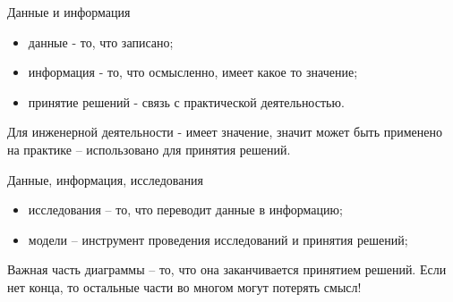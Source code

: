 \begin{frame}{Данные и информация}

\begin{center}
    
\end{center}

\begin{itemize}
    \item данные - то, что записано;
    \item информация - то, что осмысленно, имеет какое то значение;
    \item принятие решений - связь с практической деятельностью.
\end{itemize}

Для инженерной деятельности - имеет значение, значит может быть применено на практике -- использовано для принятия решений.

\end{frame}

\begin{frame}{Данные, информация, исследования}

\begin{center}
    
\end{center}

\begin{itemize}
    \item исследования -- то, что переводит данные в информацию;
    \item модели -- инструмент проведения исследований и принятия решений;
\end{itemize}

Важная часть диаграммы -- то, что она заканчивается принятием решений. Если нет конца, то остальные части во многом могут потерять смысл!

\end{frame}

